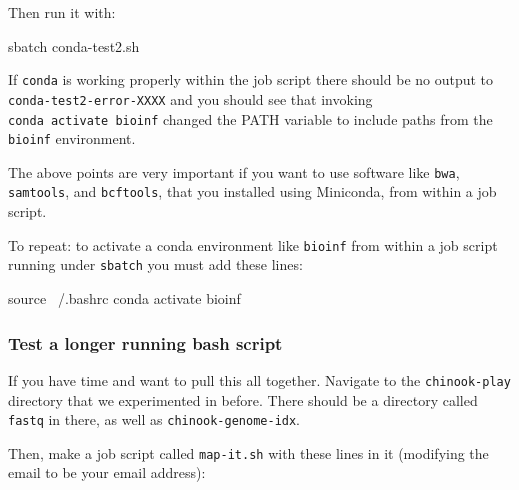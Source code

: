 \documentclass[]{krantz}
\makeatletter
\newenvironment{Shaded}{\begin{snugshade}}{\end{snugshade}}
\newcommand{\BuiltInTok}[1]{#1}
\newcommand{\ExtensionTok}[1]{#1}
\newcommand{\NormalTok}[1]{#1}
\newenvironment{kframe}{%
\medskip{}
\setlength{\fboxsep}{.8em}
 \def\at@end@of@kframe{}%
 \ifinner\ifhmode%
  \def\at@end@of@kframe{\end{minipage}}%
  \begin{minipage}{\columnwidth}%
 \fi\fi%
 \def\FrameCommand##1{\hskip\@totalleftmargin \hskip-\fboxsep
 \colorbox{shadecolor}{##1}\hskip-\fboxsep
     \hskip-\linewidth \hskip-\@totalleftmargin \hskip\columnwidth}%
 \MakeFramed {\advance\hsize-\width
   \@totalleftmargin\z@ \linewidth\hsize
   \@setminipage}}%
 {\par\unskip\endMakeFramed%
 \at@end@of@kframe}
\renewenvironment{Shaded}{\begin{kframe}}{\end{kframe}}
\makeatother
\begin{document}
Then run it with:

\begin{Shaded}
\begin{Highlighting}[]
\ExtensionTok{sbatch}\NormalTok{ conda-test2.sh}
\end{Highlighting}
\end{Shaded}

If \texttt{conda} is working properly within the job script there should be no output
to \texttt{conda-test2-error-XXXX} and you should see that invoking \texttt{conda\ activate\ bioinf}
changed the PATH variable to include paths from the \texttt{bioinf} environment.

The above points are very important if you want to use software like \texttt{bwa}, \texttt{samtools},
and \texttt{bcftools}, that you installed using Miniconda, from within a job script.

To repeat: to activate a conda environment like \texttt{bioinf} from within a job script running
under \texttt{sbatch} you must add these lines:

\begin{Shaded}
\begin{Highlighting}[]
\BuiltInTok{source}\NormalTok{ ~/.bashrc}
\ExtensionTok{conda}\NormalTok{ activate bioinf}
\end{Highlighting}
\end{Shaded}

\hypertarget{test-a-longer-running-bash-script}{%
\subsubsection{Test a longer running bash script}\label{test-a-longer-running-bash-script}}

If you have time and want to pull this all together. Navigate to the
\texttt{chinook-play} directory that we experimented in before. There should be
a directory called \texttt{fastq} in there, as well as \texttt{chinook-genome-idx}.

Then, make a job script called \texttt{map-it.sh} with these lines in it (modifying the
email to be your email address):
\end{document}
